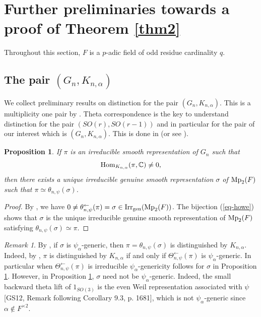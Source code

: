 \documentclass[12pt]{amsart}
\newtheorem{proposition}[theorem]{Proposition}
\theoremstyle{definition}
\theoremstyle{remark}
\newtheorem{remark}{Remark}
\begin{document}
\section{Further preliminaries towards a proof of Theorem \ref{thm2}}\label{proof-thm2}

Throughout this section, $F$ is a $p$-adic field of odd residue cardinality $q$. 

\subsection{The pair $(G_n,K_{n,\alpha})$}\label{prelim-thm2}

We collect preliminary results on distinction for the pair $(G_n,K_{n,\alpha})$. This is a multiplicity one pair by \cite{wal12}. Theta correspondence is the key to understand distinction for the pair $(SO(r),SO(r-1))$ and in particular for the pair of our interest which is $(G_n,K_{n,\alpha})$. This is done in \cite[Corollary 11.16]{ggp20} (or see \cite[Proposition 6.1]{gw21}).
\begin{proposition}\label{prop-ggp}
If $\pi$ is an irreducible smooth representation of $G_n$ such that 
\[
{\rm Hom}_{K_{n,\alpha}}(\pi,\mathbb C)\neq 0,
\]
then there exists a unique irreducible genuine smooth representation $\sigma$ of ${\rm Mp}_2(F)$ such that
$\pi\simeq\theta_{n,\psi}(\sigma)$.
\end{proposition}
\begin{proof}
By \cite[Corollary 11.16 (i)]{ggp20}, we have $0 \neq \theta_{n,\psi}^{\leftarrow}(\pi)=\sigma \in {\rm Irr}_{\rm gen}({\rm Mp}_2(F))$. 
The bijection (\ref{eq-howe}) shows that $\sigma$ is the unique irreducible genuine smooth representation of ${\rm Mp}_2(F)$ satisfying $\theta_{n,\psi}(\sigma)\simeq\pi$.
\end{proof}

\begin{remark}\label{atobe}
By \cite[Corollary 11.16 (ii)]{ggp20}, if $\sigma$ is $\psi_\alpha$-generic, then $\pi = \theta_{n,\psi}(\sigma)$ is distinguished by $K_{n,\alpha}$. Indeed, by \cite[Corollary 11.16]{ggp20}, $\pi$ is distinguished by $K_{n,\alpha}$ if and only if $\Theta_{n,\psi}^{\leftarrow}(\pi)$ is $\psi_\alpha$-generic. In particular when $\Theta_{n,\psi}^{\leftarrow}(\pi)$ is irreducible $\psi_\alpha$-genericity follows for $\sigma$ in Proposition \ref{prop-ggp}.  
However, in Proposition \ref{prop-ggp}, $\sigma$ need not be $\psi_\alpha$-generic. Indeed, the small backward theta lift of $1_{SO(3)}$ is the even Weil representation associated with $\psi$ [GS12, Remark following Corollary 9.3, p. 1681], which is not $\psi_\alpha$-generic since $\alpha\notin F^{\times2}$.
\end{remark}
\end{document}
